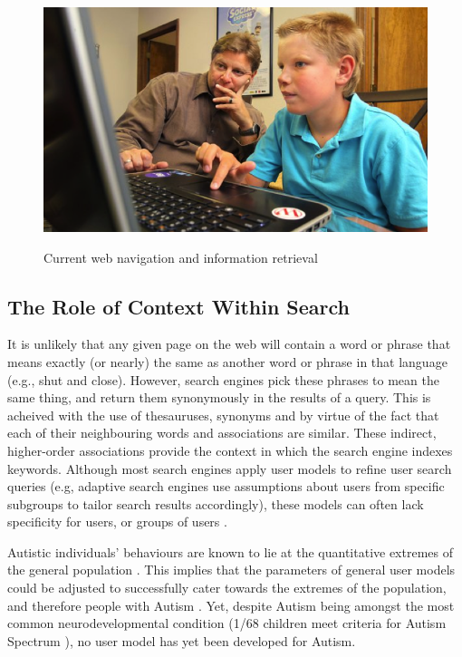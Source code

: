 \documentclass[a4paper, 11pt]{article}
\begin{document}
\begin{justify}
\begin{figure}[H]
\begin{center}
\includegraphics[scale=0.4]{person}\\
\caption{Current web navigation and information retrieval \cite{person}}
\end{center}
\end{figure}

\subsection{The Role of Context Within Search} \label{the problem}
It is unlikely that any given page on the web will contain a word or phrase that means exactly (or nearly) the same as another word or phrase in that language (e.g., shut and close). However, search engines pick these phrases to mean the same thing, and return them synonymously in the results of a query. This is acheived with the use of thesauruses, synonyms and by virtue of the fact that each of their neighbouring words and associations are similar. These indirect, higher-order associations provide the context in which the search engine indexes keywords. Although most search engines apply user models to refine user search queries (e.g, adaptive search engines use assumptions about users from specific subgroups to tailor search results accordingly), these models can often lack specificity for users, or groups of users \cite{usermodel}. 

Autistic individuals' behaviours are known to lie at the quantitative extremes of the general population \cite{robinson}. This implies that the parameters of general user models could be adjusted to successfully cater towards the extremes of the population, and therefore people with Autism \cite{bonel}. Yet, despite Autism being amongst the most common neurodevelopmental condition (1/68 children meet criteria for Autism Spectrum \cite{CDC}), no user model has yet been developed for Autism. 


\end{justify}
\end{document}
